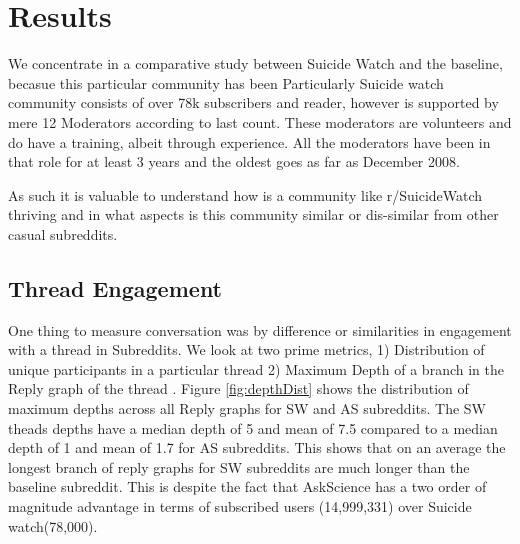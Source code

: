 \section{Results}

We concentrate in a comparative study between Suicide Watch and the baseline, becasue this particular community has been
Particularly Suicide watch community consists of over 78k subscribers and reader, however is supported by mere 12 Moderators according to last count. These moderators are volunteers and do have a training, albeit through experience. All the moderators have been in that role for at least 3 years and the oldest goes as far as December 2008. 

As such it is valuable to understand how is a community like r/SuicideWatch thriving and in what aspects is this community similar or dis-similar from other casual subreddits. 

\subsection{Thread Engagement}
One thing to measure conversation was by difference or similarities in engagement with a thread in Subreddits. We look at two prime metrics, 1) Distribution of unique participants in a particular thread  2) Maximum Depth of a branch in the Reply graph of the thread . 
Figure \ref{fig:depthDist} shows the distribution of maximum depths across all Reply graphs for SW and AS subreddits. The SW theads depths have a median depth of 5 and mean of 7.5 compared to a median depth of 1 and mean of 1.7 for AS subreddits. This shows that on an average the longest branch of reply graphs for SW subreddits are much longer than the baseline subreddit. This is despite the fact that AskScience has a two order of magnitude advantage in terms of subscribed users (14,999,331) over Suicide watch(78,000). 

